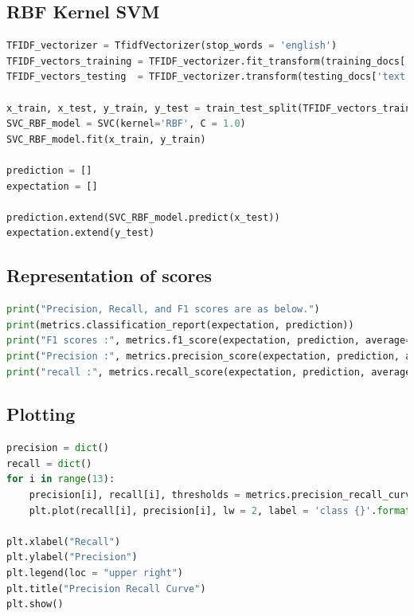 \documentclass[a4paper]{article}
\theoremstyle{plain}
\begin{document}
\subsection{RBF Kernel SVM}
\begin{lstlisting}[language=Python]
TFIDF_vectorizer = TfidfVectorizer(stop_words = 'english')
TFIDF_vectors_training = TFIDF_vectorizer.fit_transform(training_docs['text'])
TFIDF_vectors_testing  = TFIDF_vectorizer.transform(testing_docs['text'])

x_train, x_test, y_train, y_test = train_test_split(TFIDF_vectors_training, labels['classes'], test_size = 0.1)
SVC_RBF_model = SVC(kernel='RBF', C = 1.0)
SVC_RBF_model.fit(x_train, y_train)

prediction = []
expectation = []

prediction.extend(SVC_RBF_model.predict(x_test))
expectation.extend(y_test)
\end{lstlisting}


\newpage
\subsection{Representation of scores}
\begin{lstlisting}[language=Python]
print("Precision, Recall, and F1 scores are as below.")
print(metrics.classification_report(expectation, prediction))
print("F1 scores :", metrics.f1_score(expectation, prediction, average='weighted'))
print("Precision :", metrics.precision_score(expectation, prediction, average='weighted'))
print("recall :", metrics.recall_score(expectation, prediction, average ='weighted'))
\end{lstlisting}

\subsection{Plotting}
\begin{lstlisting}[language=Python]
precision = dict() 
recall = dict() 
for i in range(13):
    precision[i], recall[i], thresholds = metrics.precision_recall_curve(expectation, prediction, pos_label = (i + 1))
    plt.plot(recall[i], precision[i], lw = 2, label = 'class {}'.format(i + 1))

plt.xlabel("Recall") 
plt.ylabel("Precision")
plt.legend(loc = "upper right")
plt.title("Precision Recall Curve")
plt.show()
\end{lstlisting}


\end{document}

